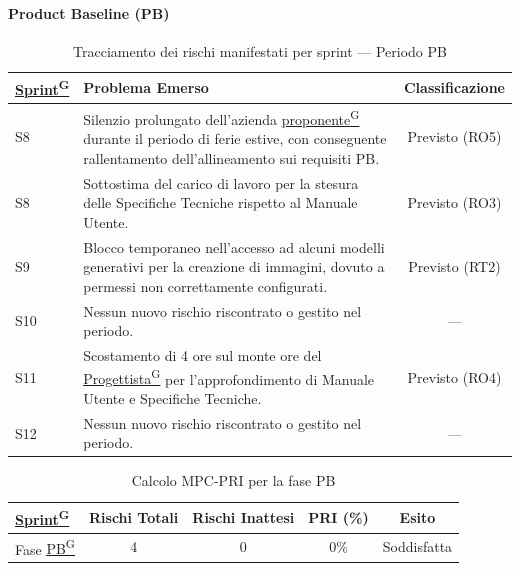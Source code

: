 \documentclass[a4paper,12pt]{article}
\providecommand{\glslink}[2]{\href{https://alittlebyte-19.github.io/Documentazione/glossario.html\#gls-#1}{\underline{#2}\textsuperscript{\scriptsize G}}}
\begin{document}
\paragraph*{Product Baseline (PB)}

\begin{table}[H]
    \centering
    \renewcommand{\arraystretch}{1.2}
    \begin{tabularx}{\textwidth}{|l|X|c|}
        \hline
        \rowcolor{gray!35}
        \textbf{\glslink{sprint}{Sprint}} & \textbf{Problema Emerso} & \textbf{Classificazione} \\
        \hline
        S8 & Silenzio prolungato dell'azienda \glslink{committente-proponente}{proponente} durante il periodo di ferie estive, con conseguente rallentamento dell'allineamento sui requisiti PB. & Previsto (RO5) \\
        \hline
        S8 & Sottostima del carico di lavoro per la stesura delle Specifiche Tecniche rispetto al Manuale Utente. & Previsto (RO3) \\
        \hline
        S9 & Blocco temporaneo nell'accesso ad alcuni modelli generativi per la creazione di immagini, dovuto a permessi non correttamente configurati. & Previsto (RT2) \\
        \hline
        S10 & Nessun nuovo rischio riscontrato o gestito nel periodo. & — \\
        \hline
        S11 & Scostamento di 4 ore sul monte ore del \glslink{progettista}{Progettista} per l'approfondimento di Manuale Utente e Specifiche Tecniche. & Previsto (RO4) \\
        \hline
        S12 & Nessun nuovo rischio riscontrato o gestito nel periodo. & — \\
        \hline
    \end{tabularx}
    \caption{Tracciamento dei rischi manifestati per sprint — Periodo PB}
\end{table}

\begin{table}[H]
    \centering
    \begin{tabular}{|l|c|c|c|c|}
        \hline
        \rowcolor{gray!35}
        \textbf{\glslink{sprint}{Sprint}} & \textbf{Rischi Totali} & \textbf{Rischi Inattesi} & \textbf{PRI (\%)} & \textbf{Esito} \\
        \hline
        Fase \glslink{pb-product-baseline}{PB} & 4 & 0 & 0\% & \textcolor{green!60!black}{Soddisfatta} \\
        \hline
    \end{tabular}
    \caption{Calcolo MPC-PRI per la fase PB}
\end{table}
\end{document}

